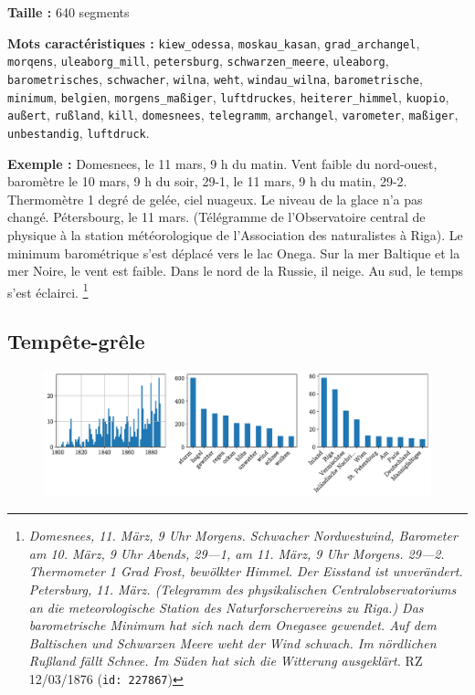 \documentclass[a4paper,twoside,12pt]{article}
\begin{document}
\begin{flushleft}
\textbf{Taille :} 640 segments

\textbf{Mots caractéristiques :} \texttt{kiew\_odessa}, \texttt{moskau\_kasan}, \texttt{grad\_archangel}, \texttt{morqens}, \texttt{uleaborg\_mill}, \texttt{petersburg}, \texttt{schwarzen\_meere}, \texttt{uleaborg}, \texttt{barometrisches}, \texttt{schwacher}, \texttt{wilna}, \texttt{weht}, \texttt{windau\_wilna}, \texttt{barometrische}, \texttt{minimum}, \texttt{belgien}, \texttt{morgens\_maßiger}, \texttt{luftdruckes}, \texttt{heiterer\_himmel}, \texttt{kuopio}, \texttt{außert}, \texttt{rußland}, \texttt{kill}, \texttt{domesnees}, \texttt{telegramm}, \texttt{archangel}, \texttt{varometer}, \texttt{maßiger}, \texttt{unbestandig}, \texttt{luftdruck}.
\end{flushleft}

\medskip

\noindent \textbf{Exemple :} \og Domesnees, le 11 mars, 9 h du matin. Vent faible du nord-ouest, baromètre le 10 mars, 9 h du soir, 29-1, le 11 mars, 9 h du matin, 29-2. Thermomètre 1 degré de gelée, ciel nuageux. Le niveau de la glace n'a pas changé. Pétersbourg, le 11 mars. (Télégramme de l'Observatoire central de physique à la station météorologique de l'Association des naturalistes à Riga). Le minimum barométrique s'est déplacé vers le lac Onega. Sur la mer Baltique et la mer Noire, le vent est faible. Dans le nord de la Russie, il neige. Au sud, le temps s'est éclairci.\fg{} \footnote{\textit{Domesnees, 11. März, 9 Uhr Morgens. Schwacher Nordwestwind, Barometer am 10. März, 9 Uhr Abends, 29—1, am 11. März, 9 Uhr Morgens. 29—2. Thermometer 1 Grad Frost, bewölkter Himmel. Der Eisstand ist unverändert. Petersburg, 11. März. (Telegramm des physikalischen Centralobservatoriums an die meteorologische Station des Naturforschervereins zu Riga.) Das barometrische Minimum hat sich nach dem Onegasee gewendet. Auf dem Baltischen und Schwarzen Meere weht der Wind schwach. Im nördlichen Rußland fällt Schnee. Im Süden hat sich die Witterung ausgeklärt.} RZ 12/03/1876 (\texttt{id: 227867})}

\clearpage


\subsection*{Tempête-grêle} \label{topic12_tempête-grêle}

\begin{figure}[H]
\centering
\includegraphics[width=\textwidth]{images/topic_charts_12.pdf}
\end{figure}
\end{document}
